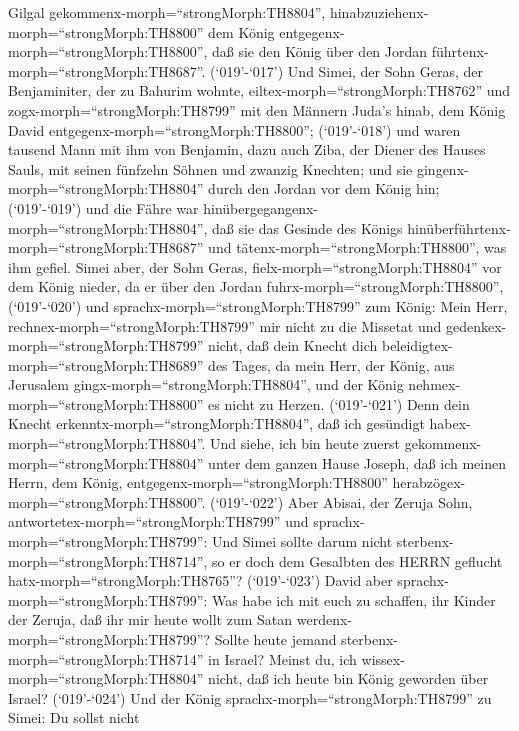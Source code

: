Gilgal gekommenx-morph=``strongMorph:TH8804'',
hinabzuziehenx-morph=``strongMorph:TH8800'' dem König
entgegenx-morph=``strongMorph:TH8800'', daß sie den König über den
Jordan führtenx-morph=``strongMorph:TH8687''. 
(`019'-`017') Und Simei, der Sohn Geras, der Benjaminiter, der zu
Bahurim wohnte, eiltex-morph=``strongMorph:TH8762'' und
zogx-morph=``strongMorph:TH8799'' mit den Männern Juda's hinab, dem
König David entgegenx-morph=``strongMorph:TH8800''; 
(`019'-`018') und waren tausend Mann mit ihm von Benjamin, dazu auch
Ziba, der Diener des Hauses Sauls, mit seinen fünfzehn Söhnen und
zwanzig Knechten; und sie gingenx-morph=``strongMorph:TH8804'' durch den
Jordan vor dem König hin;  (`019'-`019') und die Fähre war
hinübergegangenx-morph=``strongMorph:TH8804'', daß sie das Gesinde des
Königs hinüberführtenx-morph=``strongMorph:TH8687'' und
tätenx-morph=``strongMorph:TH8800'', was ihm gefiel. Simei aber, der
Sohn Geras, fielx-morph=``strongMorph:TH8804'' vor dem König nieder, da
er über den Jordan fuhrx-morph=``strongMorph:TH8800'', 
(`019'-`020') und sprachx-morph=``strongMorph:TH8799'' zum König: Mein
Herr, rechnex-morph=``strongMorph:TH8799'' mir nicht zu die Missetat und
gedenkex-morph=``strongMorph:TH8799'' nicht, daß dein Knecht dich
beleidigtex-morph=``strongMorph:TH8689'' des Tages, da mein Herr, der
König, aus Jerusalem gingx-morph=``strongMorph:TH8804'', und der König
nehmex-morph=``strongMorph:TH8800'' es nicht zu Herzen. 
(`019'-`021') Denn dein Knecht erkenntx-morph=``strongMorph:TH8804'',
daß ich gesündigt habex-morph=``strongMorph:TH8804''. Und siehe, ich bin
heute zuerst gekommenx-morph=``strongMorph:TH8804'' unter dem ganzen
Hause Joseph, daß ich meinen Herrn, dem König,
entgegenx-morph=``strongMorph:TH8800''
herabzögex-morph=``strongMorph:TH8800''.  (`019'-`022')
Aber Abisai, der Zeruja Sohn, antwortetex-morph=``strongMorph:TH8799''
und sprachx-morph=``strongMorph:TH8799'': Und Simei sollte darum nicht
sterbenx-morph=``strongMorph:TH8714'', so er doch dem Gesalbten des
HERRN geflucht hatx-morph=``strongMorph:TH8765''? 
(`019'-`023') David aber sprachx-morph=``strongMorph:TH8799'': Was habe
ich mit euch zu schaffen, ihr Kinder der Zeruja, daß ihr mir heute wollt
zum Satan werdenx-morph=``strongMorph:TH8799''? Sollte heute jemand
sterbenx-morph=``strongMorph:TH8714'' in Israel? Meinst du, ich
wissex-morph=``strongMorph:TH8804'' nicht, daß ich heute bin König
geworden über Israel?  (`019'-`024') Und der König
sprachx-morph=``strongMorph:TH8799'' zu Simei: Du sollst nicht
